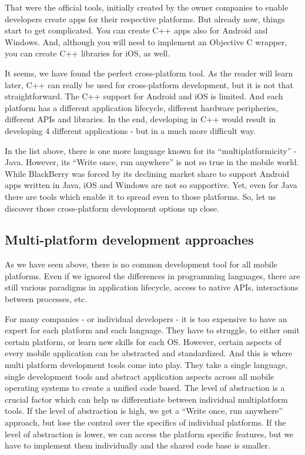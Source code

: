 \documentclass[english,master,public,dept460,male,cpdeclaration,oneside]{diploma}
\begin{document}
That were the official tools, initially created by the owner companies to enable developers create apps for their respective platforms. But already now, things start to get complicated. You can create C++ apps also for Android and Windows. And, although you will need to implement an Objective C wrapper, you can create C++ libraries for iOS, as well.

It seems, we have found the perfect cross-platform tool. As the reader will learn later, C++ can really be used for cross-platform development, but it is not that straightforward. The C++ support for Android and iOS is limited. And each platform has a different application lifecycle, different hardware peripheries, different APIs and libraries. In the end, developing in C++ would result in developing 4 different applications - but in a much more difficult way.

In the list above, there is one more language known for its “multiplatformicity” - Java. However, its “Write once, run anywhere” is not so true in the mobile world. While BlackBerry was forced by its declining market share to support Android apps written in Java, iOS and Windows are not so supportive. Yet, even for Java there are tools which enable it to spread even to those platforms. So, let us discover those cross-platform development options up close.

\subsection{Multi-platform development approaches}
As we have seen above, there is no common development tool for all mobile platforms. Even if we ignored the differences in programming languages, there are still various paradigms in application lifecycle, access to native APIs, interactions between processes, etc.

For many companies - or individual developers - it is too expensive to have an expert for each platform and each language. They have to struggle, to either omit certain platform, or learn new skills for each OS. However, certain aspects of every mobile application can be abstracted and standardized. And this is where multi platform development tools come into play. They take a single language, single development tools and abstract application aspects across all mobile operating systems to create a unified code based. The level of abstraction is a crucial factor which can help us differentiate between individual multiplatform tools. If the level of abstraction is high, we get a “Write once, run anywhere” approach, but lose the control over the specifics of individual platforms. If the level of abstraction is lower, we can access the platform specific features, but we have to implement them individually and the shared code base is smaller.
\end{document}
